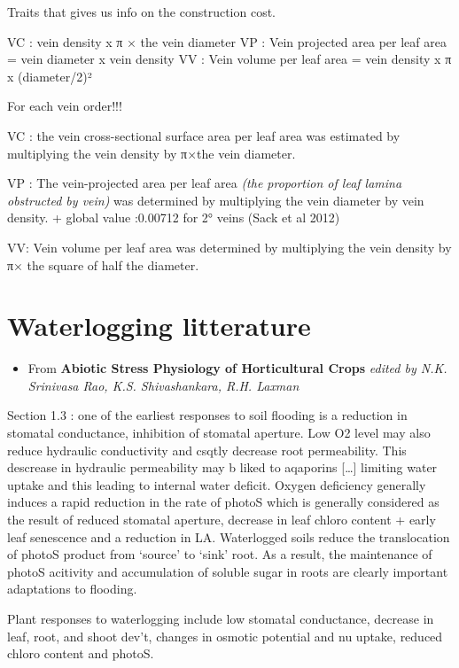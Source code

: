 \documentclass[
]{book}
\providecommand{\tightlist}{%
  \setlength{\itemsep}{0pt}\setlength{\parskip}{0pt}}
\begin{document}
Traits that gives us info on the construction cost.

VC : vein density x π × the vein diameter
VP : Vein projected area per leaf area = vein diameter x vein density
VV : Vein volume per leaf area = vein density x π x (diameter/2)²

For each vein order!!!

VC : the vein cross-sectional surface area per leaf area was estimated by multiplying the vein density by π×the vein diameter.

VP : The vein-projected area per leaf area \emph{(the proportion of leaf lamina obstructed by vein)} was determined by multiplying the vein diameter by vein density.
+ global value :0.00712 for 2° veins (Sack et al 2012)

VV: Vein volume per leaf area was determined by multiplying the vein density by π× the square of half the diameter.

\hypertarget{waterlogging-litterature}{%
\chapter{Waterlogging litterature}\label{waterlogging-litterature}}

\begin{itemize}
\tightlist
\item
  From \textbf{Abiotic Stress Physiology of Horticultural Crops} \emph{edited by N.K. Srinivasa Rao, K.S. Shivashankara, R.H. Laxman}
\end{itemize}

Section 1.3 : one of the earliest responses to soil flooding is a reduction in stomatal conductance, inhibition of stomatal aperture. Low O2 level may also reduce hydraulic conductivity and csqtly decrease root permeability. This descrease in hydraulic permeability may b liked to aqaporins {[}\ldots{]} limiting water uptake and this leading to internal water deficit. Oxygen deficiency generally induces a rapid reduction in the rate of photoS which is generally considered as the result of reduced stomatal aperture, decrease in leaf chloro content + early leaf senescence and a reduction in LA. Waterlogged soils reduce the translocation of photoS product from `source' to `sink' root. As a result, the maintenance of photoS acitivity and accumulation of soluble sugar in roots are clearly important adaptations to flooding.

Plant responses to waterlogging include low stomatal conductance, decrease in leaf, root, and shoot dev't, changes in osmotic potential and nu uptake, reduced chloro content and photoS.
\end{document}
